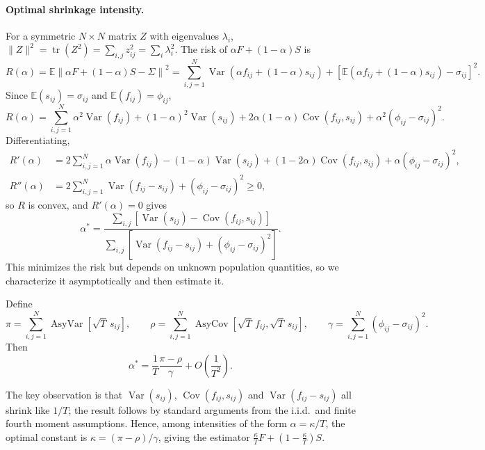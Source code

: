 \paragraph{Optimal shrinkage intensity.}
For a symmetric $N \times N$ matrix $Z$ with eigenvalues $\lambda_i$, $\|Z\|^2 = \operatorname{tr}(Z^2) = \sum_{i,j} z_{ij}^2 = \sum_i \lambda_i^2$. The risk of $\alpha F + (1-\alpha)S$ is
\[
  R(\alpha) = \mathbb{E}\left\| \alpha F + (1-\alpha) S - \Sigma \right\|^2
  = \sum_{i,j=1}^N \operatorname{Var}\left( \alpha f_{ij} + (1-\alpha) s_{ij} \right)
  + \left[ \mathbb{E}\left( \alpha f_{ij} + (1-\alpha) s_{ij} \right) - \sigma_{ij} \right]^2 .
\]
Since $\mathbb{E}(s_{ij}) = \sigma_{ij}$ and $\mathbb{E}(f_{ij}) = \phi_{ij}$,
\[
  R(\alpha) = \sum_{i,j=1}^N \alpha^2 \operatorname{Var}(f_{ij}) + (1-\alpha)^2 \operatorname{Var}(s_{ij})
  + 2\alpha(1-\alpha) \operatorname{Cov}(f_{ij}, s_{ij}) + \alpha^2 (\phi_{ij} - \sigma_{ij})^2 .
\]
Differentiating,
\begin{align*}
  R'(\alpha) &= 2 \sum_{i,j=1}^N \alpha \operatorname{Var}(f_{ij}) - (1-\alpha) \operatorname{Var}(s_{ij})
  + (1-2\alpha) \operatorname{Cov}(f_{ij}, s_{ij}) + \alpha (\phi_{ij} - \sigma_{ij})^2, \\
  R''(\alpha) &= 2 \sum_{i,j=1}^N \operatorname{Var}(f_{ij} - s_{ij}) + (\phi_{ij} - \sigma_{ij})^2 \geq 0,
\end{align*}
so $R$ is convex, and $R'(\alpha) = 0$ gives
\[
  \alpha^* = \frac{\sum_{i,j} \left[ \operatorname{Var}(s_{ij}) - \operatorname{Cov}(f_{ij}, s_{ij}) \right]}
  {\sum_{i,j} \left[ \operatorname{Var}(f_{ij} - s_{ij}) + (\phi_{ij} - \sigma_{ij})^2 \right]}.
\]
This minimizes the risk but depends on unknown population quantities, so we characterize it asymptotically and then estimate it.

\begin{theorem}
Define
\[
  \pi = \sum_{i,j=1}^N \operatorname{AsyVar}\left[ \sqrt{T}\, s_{ij} \right], \qquad
  \rho = \sum_{i,j=1}^N \operatorname{AsyCov}\left[ \sqrt{T}\, f_{ij}, \sqrt{T}\, s_{ij} \right], \qquad
  \gamma = \sum_{i,j=1}^N (\phi_{ij} - \sigma_{ij})^2 .
\]
Then
\[
  \alpha^* = \frac{1}{T} \frac{\pi - \rho}{\gamma} + O\!\left( \frac{1}{T^2} \right).
\]
\end{theorem}

The key observation is that $\operatorname{Var}(s_{ij})$, $\operatorname{Cov}(f_{ij}, s_{ij})$ and $\operatorname{Var}(f_{ij} - s_{ij})$ all shrink like $1/T$; the result follows by standard arguments from the i.i.d.\ and finite fourth moment assumptions. Hence, among intensities of the form $\alpha = \kappa/T$, the optimal constant is $\kappa = (\pi - \rho)/\gamma$, giving the estimator $\frac{\kappa}{T} F + \left( 1 - \frac{\kappa}{T} \right) S$.

